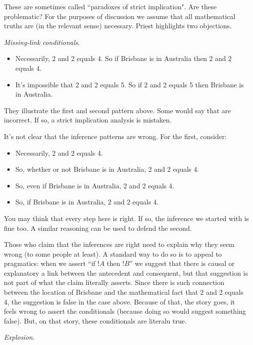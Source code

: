 \documentclass[../../../include/open-logic-section]{subfiles}
\begin{document}
These are sometimes called ``paradoxes of strict implication". Are these problematic? For the purposes of discussion we assume that all mathematical truths are (in the relevant sense) necessary. Priest highlights two objections.

\emph{Missing-link conditionals}.

\begin{itemize}
	\item Necessarily, 2 and 2 equals 4. So if Brisbane is in Australia then 2 and 2 equals 4. 
	\item It's impossible that 2 and 2 equals 5. So if 2 and 2 equals 5 then Brisbane is in Australia.
\end{itemize}

They illustrate the first and second pattern above. Some would say that are incorrect. If so, a strict implication analysis is mistaken.

It's not clear that the inference patterns are wrong. For the first, consider:

\begin{itemize}
	\item Necessarily, 2 and 2 equals 4. 
	\item So, whether or not Brisbane is in Australia, 2 and 2 equals 4.
	\item So, even if Brisbane is in Australia, 2 and 2 equals 4.
	\item So, if Brisbane is in Australia, 2 and 2 equals 4. 
\end{itemize}

You may think that every step here is right. If so, the inference we started with is fine too. A similar reasoning can be used to defend the second. 

Those who claim that the inferences are right need to explain why they seem wrong (to some people at least). A standard way to do so is to appeal to pragmatics: when we assert ``if $!A$ then $!B$'' we suggest that there is causal or explanatory a link between the antecedent and consequent, but that suggestion is not part of what the claim literally asserts. Since there is such connection between the location of Brisbane and the mathematical fact that 2 and 2 equals 4, the suggestion is false in the case above. Because of that, the story goes, it feels wrong to assert the conditionals (because doing so would suggest something false). But, on that story, these conditionals are literalu true.

\emph{Explosion}. 
\end{document}
